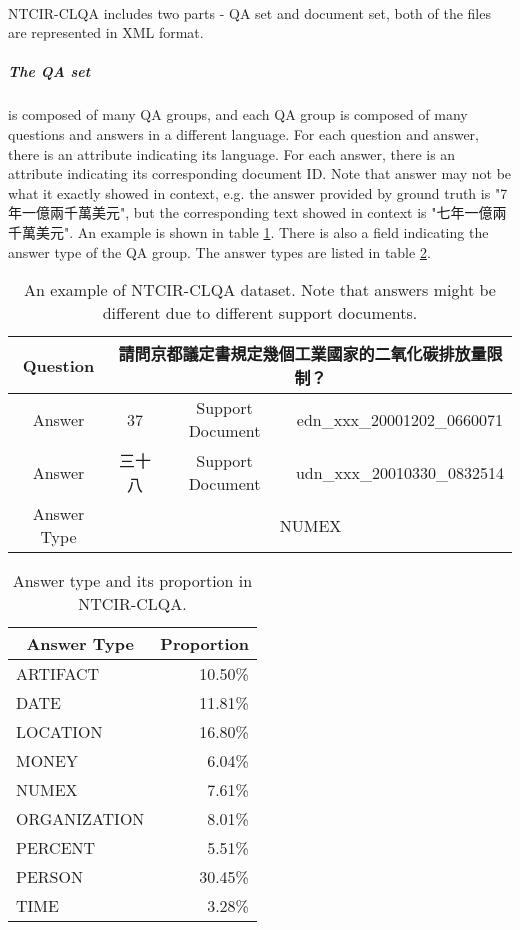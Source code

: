 \documentclass{article}
\begin{document}
\paragraph{}
NTCIR-CLQA includes two parts - QA set and document set, both of the files are represented in XML format.

\begin{CJK*}{UTF8}{bsmi}
\subparagraph{The QA set} is composed of many QA groups, and each QA group is composed of many questions and answers in a different language. For each question and answer, there is an attribute indicating its language. For each answer, there is an attribute indicating its corresponding document ID. Note that answer may not be what it exactly showed in context, e.g. the answer provided by ground truth is "7年一億兩千萬美元", but the corresponding text showed in context is "七年一億兩千萬美元". An example is shown in table \ref{tab:clqa-qa}. There is also a field indicating the answer type of the QA group. The answer types are listed in table \ref{tab:answer-types}.
\end{CJK*}

\begin{CJK*}{UTF8}{bsmi}
  \begin{table}[ht!]
    \centering
    \begin{tabular}{|c|c|c|c|}
    \hline
    Question & \multicolumn{3}{c|}{請問京都議定書規定幾個工業國家的二氧化碳排放量限制？} \\ \hline
    Answer & 37 & Support Document & edn\_xxx\_20001202\_0660071 \\ \hline
    Answer & 三十八 & Support Document & udn\_xxx\_20010330\_0832514 \\ \hline
    Answer Type & \multicolumn{3}{c|}{NUMEX} \\ \hline
    \end{tabular}
    \caption{An example of NTCIR-CLQA dataset. Note that answers might be different due to different support documents.}
    \label{tab:clqa-qa}
  \end{table}
\end{CJK*}

\begin{table}[ht!]
  \centering
  \begin{tabular}{lr}
    \multicolumn{1}{c}{Answer Type} & \multicolumn{1}{c}{Proportion} \\
    \toprule
    ARTIFACT & 10.50\% \\
    DATE & 11.81\% \\
    LOCATION & 16.80\% \\
    MONEY & 6.04\% \\
    NUMEX & 7.61\% \\
    ORGANIZATION & 8.01\% \\
    PERCENT & 5.51\% \\
    PERSON & 30.45\% \\
    TIME & 3.28\%
  \end{tabular}
  \caption{Answer type and its proportion in NTCIR-CLQA.}
  \label{tab:answer-types}
\end{table}
\end{document}
